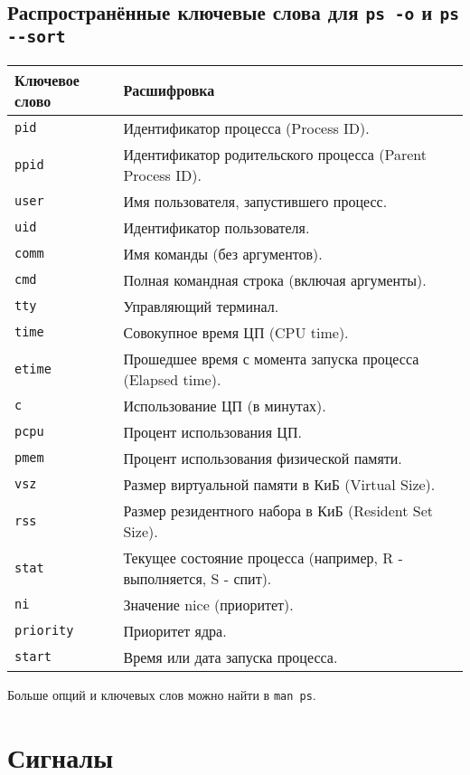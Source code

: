 \documentclass{article}
\begin{document}
\subsection*{Распространённые ключевые слова для \texttt{ps -o} и \texttt{ps -{}-sort}}
\begin{flushleft}
\begin{tabular}{ l | l }
Ключевое слово 	    		& Расшифровка \\ \hline
\texttt{pid}	    		& Идентификатор процесса (Process ID).\\
\texttt{ppid}	    		& Идентификатор родительского процесса (Parent Process ID).\\
\texttt{user}	    		& Имя пользователя, запустившего процесс.\\
\texttt{uid}	    		& Идентификатор пользователя.\\
\texttt{comm} 	 			& Имя команды (без аргументов). \\
\texttt{cmd}				& Полная командная строка (включая аргументы).\\
\texttt{tty}				& Управляющий терминал.\\
\texttt{time}				& Совокупное время ЦП (CPU time).\\
\texttt{etime}				& Прошедшее время с момента запуска процесса (Elapsed time).\\
\texttt{c}					& Использование ЦП (в минутах).\\
\texttt{pcpu}				& Процент использования ЦП.\\
\texttt{pmem}				& Процент использования физической памяти.\\
\texttt{vsz}				& Размер виртуальной памяти в КиБ (Virtual Size).\\
\texttt{rss}				& Размер резидентного набора в КиБ (Resident Set Size).\\
\texttt{stat}				& Текущее состояние процесса (например, R - выполняется, S - спит).\\
\texttt{ni}					& Значение nice (приоритет).\\
\texttt{priority}			& Приоритет ядра.\\
\texttt{start}				& Время или дата запуска процесса.\\
\end{tabular}
\end{flushleft}

\noindent Больше опций и ключевых слов можно найти в \texttt{man ps}.




\section*{Сигналы}
\end{document}
